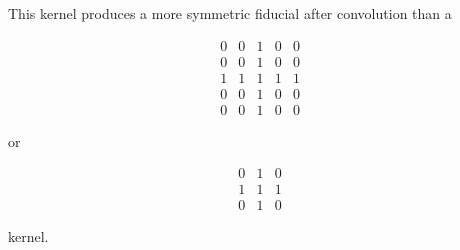 \documentclass[10pt]{article}
\begin{document}
    This kernel produces a more symmetric fiducial after convolution than a 

    \[ \begin{array}{ccccc}
    0 & 0 & 1 & 0 & 0 \\
    0 & 0 & 1 & 0 & 0 \\
    1 & 1 & 1 & 1 & 1 \\
    0 & 0 & 1 & 0 & 0 \\
    0 & 0 & 1 & 0 & 0 \end{array}\] 

    or

    \[ \begin{array}{ccc}
    0 & 1 & 0 \\
    1 & 1 & 1 \\
    0 & 1 & 0 \end{array}\] 

    kernel.
\end{document}
